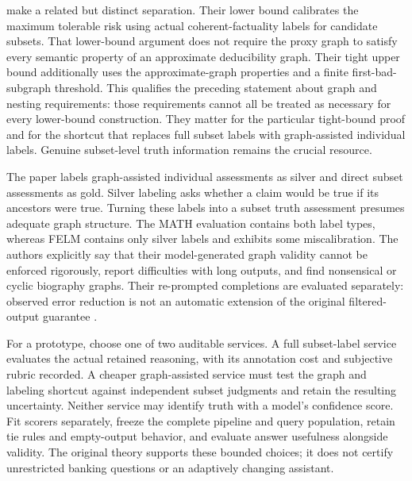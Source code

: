 \citet{exec23_coherent_factuality} make a related but distinct separation.
Their lower bound calibrates the maximum tolerable risk using actual
coherent-factuality labels for candidate subsets. That lower-bound argument
does not require the proxy graph to satisfy every semantic property of an
approximate deducibility graph. Their tight upper bound additionally uses
the approximate-graph properties and a finite first-bad-subgraph threshold.
This qualifies the preceding statement about graph and nesting requirements:
those requirements cannot all be treated as necessary for every lower-bound
construction. They matter for the particular tight-bound proof and for the
shortcut that replaces full subset labels with graph-assisted individual
labels. Genuine subset-level truth information remains the crucial resource.

The paper labels graph-assisted individual assessments as silver and direct
subset assessments as gold. Silver labeling asks whether a claim would be
true if its ancestors were true. Turning these labels into a subset truth
assessment presumes adequate graph structure. The MATH evaluation contains
both label types, whereas FELM contains only silver labels and exhibits
some miscalibration. The authors explicitly say that their model-generated
graph validity cannot be enforced rigorously, report difficulties with long
outputs, and find nonsensical or cyclic biography graphs. Their re-prompted
completions are evaluated separately: observed error reduction is not an
automatic extension of the original filtered-output guarantee
\citep{exec23_coherent_factuality}.

For a prototype, choose one of two auditable services. A full subset-label
service evaluates the actual retained reasoning, with its annotation cost
and subjective rubric recorded. A cheaper graph-assisted service must test
the graph and labeling shortcut against independent subset judgments and
retain the resulting uncertainty. Neither service may identify truth with
a model's confidence score. Fit scorers separately, freeze the complete
pipeline and query population, retain tie rules and empty-output behavior,
and evaluate answer usefulness alongside validity. The original theory
supports these bounded choices; it does not certify unrestricted banking
questions or an adaptively changing assistant.

